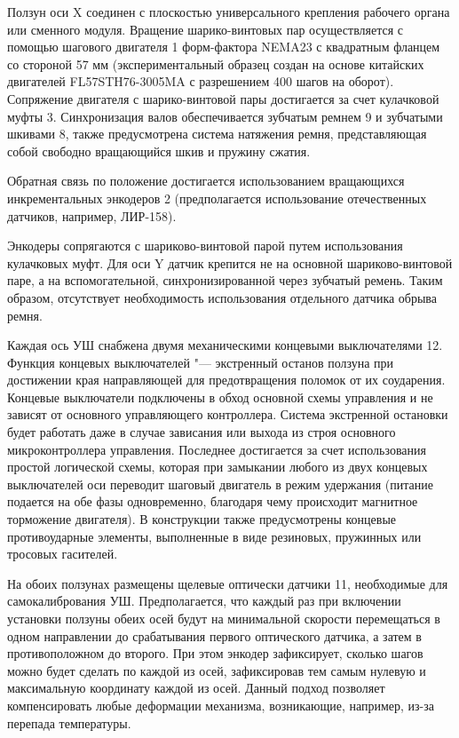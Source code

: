 Ползун оси X соединен с плоскостью универсального крепления рабочего органа или сменного модуля.
Вращение шарико-винтовых пар осуществляется с помощью шагового двигателя 1 форм-фактора NEMA23 с квадратным фланцем со стороной 57 мм (экспериментальный образец создан на основе китайских двигателей FL57STH76-3005MA с разрешением 400 шагов на оборот). Сопряжение двигателя с шарико-винтовой пары достигается за счет кулачковой муфты 3. Синхронизация валов обеспечивается зубчатым ремнем 9 и зубчатыми шкивами 8, также предусмотрена система натяжения ремня, представляющая собой свободно вращающийся шкив и пружину сжатия.

Обратная связь по положение достигается использованием вращающихся инкрементальных энкодеров 2 (предполагается использование отечественных датчиков, например, ЛИР-158).

Энкодеры сопрягаются с шариково-винтовой парой путем использования кулачковых муфт. Для оси Y датчик крепится не на основной шариково-винтовой паре, а на вспомогательной, синхронизированной через зубчатый ремень. Таким образом, отсутствует необходимость использования отдельного датчика обрыва ремня. 

Каждая ось УШ снабжена двумя механическими концевыми выключателями 12. Функция концевых выключателей "--- экстренный останов ползуна при достижении края направляющей для предотвращения поломок от их соударения. Концевые выключатели подключены в обход основной схемы управления и не зависят от основного управляющего контроллера. Система экстренной остановки будет работать даже в случае зависания или выхода из строя основного микроконтроллера управления. Последнее достигается за счет использования простой логической схемы, которая при замыкании любого из двух концевых выключателей оси переводит шаговый двигатель в режим удержания (питание подается на обе фазы одновременно, благодаря чему происходит магнитное торможение двигателя). В конструкции также предусмотрены концевые противоударные элементы, выполненные в виде резиновых, пружинных или тросовых гасителей.

На обоих ползунах размещены щелевые оптически датчики 11, необходимые для самокалибрования УШ. Предполагается, что каждый раз при включении установки ползуны обеих осей будут на минимальной скорости перемещаться в одном направлении до срабатывания первого оптического датчика, а затем в противоположном до второго. При этом энкодер зафиксирует, сколько шагов можно будет сделать по каждой из осей, зафиксировав тем самым нулевую и максимальную координату каждой из осей. Данный подход позволяет компенсировать любые деформации механизма, возникающие, например, из-за перепада температуры.

